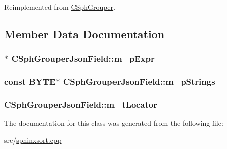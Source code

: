 Reimplemented from \hyperlink{classCSphGrouper_ab963d24e91267e114176b78fc32b788e}{C\-Sph\-Grouper}.



\subsection{Member Data Documentation}
\hypertarget{classCSphGrouperJsonField_a14515cdd744c81c8901f7ebfa81d805b}{
\subsubsection[{m\-\_\-p\-Expr}]{$\ast$ C\-Sph\-Grouper\-Json\-Field\-::m\-\_\-p\-Expr}}\label{classCSphGrouperJsonField_a14515cdd744c81c8901f7ebfa81d805b}
\hypertarget{classCSphGrouperJsonField_a8c72ba9aa6cc272978702ce8ae87c647}{
\subsubsection[{m\-\_\-p\-Strings}]{\setlength{\rightskip}{0pt plus 5cm}const {\bf B\-Y\-T\-E}$\ast$ C\-Sph\-Grouper\-Json\-Field\-::m\-\_\-p\-Strings}}\label{classCSphGrouperJsonField_a8c72ba9aa6cc272978702ce8ae87c647}
\hypertarget{classCSphGrouperJsonField_a86460dbb9fd94cb4aacda77002550e51}{
\subsubsection[{m\-\_\-t\-Locator}]{ C\-Sph\-Grouper\-Json\-Field\-::m\-\_\-t\-Locator\hspace{0.3cm}{\ttfamily [protected]}}}\label{classCSphGrouperJsonField_a86460dbb9fd94cb4aacda77002550e51}


The documentation for this class was generated from the following file\-:\begin{DoxyCompactItemize}
\item 
src/\hyperlink{sphinxsort_8cpp}{sphinxsort.\-cpp}\end{DoxyCompactItemize}
